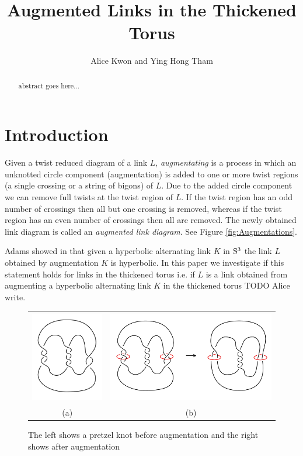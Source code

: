 \documentclass[11pt]{amsart}
\title [Augmented Links in the Thickened Torus] {Augmented Links in the Thickened Torus}
\author[Alice Kwon and Ying Hong Tham]{Alice Kwon and Ying Hong Tham}
\newcommand{\Sp}{{\rm{S}}}
\theoremstyle{plain}
\theoremstyle{definition}
\begin{document}
\maketitle

\begin{abstract}
  abstract goes here...
\end{abstract}

\section{Introduction}

Given a twist reduced diagram of a link $L$, \emph{augmentating} is a process in
which an unknotted circle component (augmentation) is added to one or
more twist regions (a
single crossing or a string of bigons) of $L$. Due to the added circle component
we can remove full twists at the twist region of $L$. If the twist region has an
odd number of crossings then all but one crossing is removed, whereas if the
twist region has an even number of crossings then all are removed. The newly
obtained link diagram is called an {\it augmented link diagram}. See Figure
\ref{fig:Augmentations}.

Adams showed in \cite{CA} that given a hyperbolic alternating link $K$ in
$\Sp^3$ the link $L$ obtained by augmentation $K$ is hyperbolic. In this paper
we investigate if this statement holds for links in the thickened torus i.e. if
$L$ is a link obtained from augmenting a hyperbolic alternating link $K$ in the
thickened torus TODO Alice write.
 \begin{figure}
 \centering  
 \begin{tabular}{cc}
 \includegraphics [height=4cm]{augmentation1}&
  \includegraphics [height=4cm]{augmentation2}\\
  (a)&(b)
  \end{tabular}
 \caption{The left shows a pretzel knot before augmentation and the right shows after augmentation}
 \label{fig:augmentationS3}
 \end{figure}
 
\end{document}
